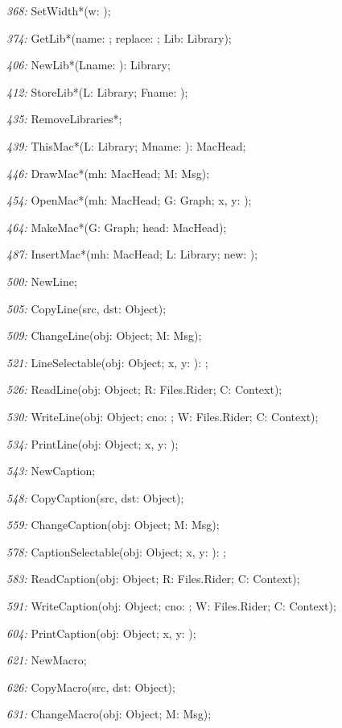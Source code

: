 \item{\it 368:} SetWidth*(w: \INTEGER);
\item{\it 374:} GetLib*(name: \ARRAYOF\CHAR; replace: \BOOLEAN; \VAR Lib: Library);
\item{\it 406:} NewLib*(Lname: \ARRAYOF\CHAR): Library;
\item{\it 412:} StoreLib*(L: Library; Fname: \ARRAYOF\CHAR);
\item{\it 435:} RemoveLibraries*;
\item{\it 439:} ThisMac*(L: Library; Mname: \ARRAYOF\CHAR): MacHead;
\item{\it 446:} DrawMac*(mh: MacHead; \VAR M: Msg);
\item{\it 454:} OpenMac*(mh: MacHead; G: Graph; x, y: \INTEGER);
\item{\it 464:} MakeMac*(G: Graph; \VAR head: MacHead);
\item{\it 487:} InsertMac*(mh: MacHead; L: Library; \VAR new: \BOOLEAN);
\item{\it 500:} NewLine;
\item{\it 505:} CopyLine(src, dst: Object);
\item{\it 509:} ChangeLine(obj: Object; \VAR M: Msg);
\item{\it 521:} LineSelectable(obj: Object; x, y: \INTEGER): \BOOLEAN;
\item{\it 526:} ReadLine(obj: Object; \VAR R: Files.Rider; \VAR C: Context);
\item{\it 530:} WriteLine(obj: Object; cno: \INTEGER; \VAR W: Files.Rider; \VAR C: Context);
\item{\it 534:} PrintLine(obj: Object; x, y: \INTEGER);
\item{\it 543:} NewCaption;
\item{\it 548:} CopyCaption(src, dst: Object);
\item{\it 559:} ChangeCaption(obj: Object;  \VAR M: Msg);
\item{\it 578:} CaptionSelectable(obj: Object; x, y: \INTEGER): \BOOLEAN;
\item{\it 583:} ReadCaption(obj: Object; \VAR R: Files.Rider; \VAR C: Context);
\item{\it 591:} WriteCaption(obj: Object; cno: \INTEGER; \VAR W: Files.Rider; \VAR C: Context);
\item{\it 604:} PrintCaption(obj: Object; x, y: \INTEGER);
\item{\it 621:} NewMacro;
\item{\it 626:} CopyMacro(src, dst: Object);
\item{\it 631:} ChangeMacro(obj: Object; \VAR M: Msg);

